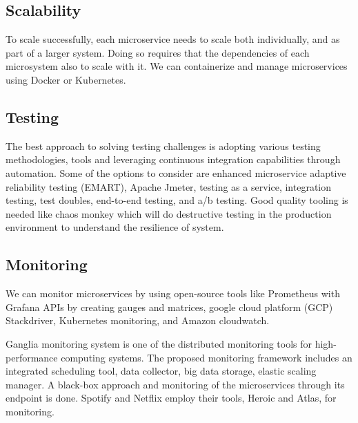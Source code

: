 \subsection{Scalability}%
 To scale successfully, each microservice needs to scale both individually, and as part of a larger system. Doing so requires that the dependencies of each microsystem also to scale with it. We can containerize and manage  microservices using Docker or Kubernetes.\cite{coulson2020, khan2020, McElhiney2018, Bahadori2018}


\subsection{Testing}%
The best approach to solving testing challenges is adopting various testing methodologies, tools and leveraging continuous integration capabilities through automation.
Some of the options to consider are enhanced microservice adaptive reliability testing (EMART),\cite{Russo2020} Apache Jmeter,\cite{Johansson2019} testing as a service,\cite{Vanska2019} integration testing, test doubles,\cite{Huttunen2017} end-to-end testing, and a/b testing.\cite{Dmitrii2019, Zaytev2018} Good quality tooling is needed like chaos monkey which will do destructive testing in the production environment to understand the resilience of system.\cite{Netflix}


\subsection{Monitoring}%
We can monitor microservices by using open-source tools like Prometheus with Grafana APIs by creating gauges and matrices, google cloud platform (GCP) Stackdriver, Kubernetes monitoring, and Amazon cloudwatch.\cite{Venugopal2017, Kalske2017paper, Zhang2019, Monterio2018}

Ganglia monitoring system is one of the distributed monitoring tools for high-performance computing systems.\cite{Kristiani2020} The proposed monitoring framework includes an integrated scheduling tool, data collector, big data storage, elastic scaling manager.\cite{Zhihui2020} %
%
%
A black-box approach and monitoring of the microservices through its endpoint is done.\cite{Utomo2020} Spotify\cite{Kevin2015} and Netflix\cite{Netflix} employ their tools, Heroic and Atlas, for monitoring.

